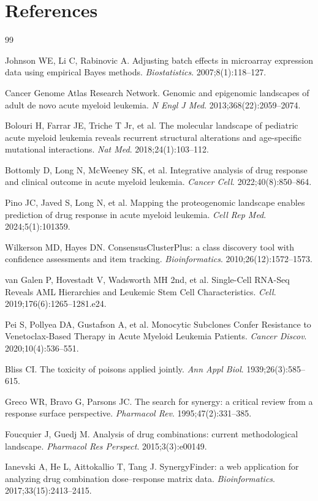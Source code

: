 \documentclass[11pt,a4paper]{article}
\begin{document}
\section*{References}
\begin{thebibliography}{99}

Johnson WE, Li C, Rabinovic A.
Adjusting batch effects in microarray expression data using empirical Bayes methods.
\textit{Biostatistics}. 2007;8(1):118--127.

Cancer Genome Atlas Research Network.
Genomic and epigenomic landscapes of adult de novo acute myeloid leukemia.
\textit{N Engl J Med}. 2013;368(22):2059--2074.

Bolouri H, Farrar JE, Triche T Jr, et al.
The molecular landscape of pediatric acute myeloid leukemia reveals recurrent structural alterations and age-specific mutational interactions.
\textit{Nat Med}. 2018;24(1):103--112.

Bottomly D, Long N, McWeeney SK, et al.
Integrative analysis of drug response and clinical outcome in acute myeloid leukemia.
\textit{Cancer Cell}. 2022;40(8):850--864.

Pino JC, Javed S, Long N, et al.
Mapping the proteogenomic landscape enables prediction of drug response in acute myeloid leukemia.
\textit{Cell Rep Med}. 2024;5(1):101359.

Wilkerson MD, Hayes DN.
ConsensusClusterPlus: a class discovery tool with confidence assessments and item tracking.
\textit{Bioinformatics}. 2010;26(12):1572--1573.

van Galen P, Hovestadt V, Wadsworth MH 2nd, et al.
Single-Cell RNA-Seq Reveals AML Hierarchies and Leukemic Stem Cell Characteristics.
\textit{Cell}. 2019;176(6):1265--1281.e24.

Pei S, Pollyea DA, Gustafson A, et al.
Monocytic Subclones Confer Resistance to Venetoclax-Based Therapy in Acute Myeloid Leukemia Patients.
\textit{Cancer Discov}. 2020;10(4):536--551.

Bliss CI.
The toxicity of poisons applied jointly.
\textit{Ann Appl Biol}. 1939;26(3):585--615.

Greco WR, Bravo G, Parsons JC.
The search for synergy: a critical review from a response surface perspective.
\textit{Pharmacol Rev}. 1995;47(2):331--385.

Foucquier J, Guedj M.
Analysis of drug combinations: current methodological landscape.
\textit{Pharmacol Res Perspect}. 2015;3(3):e00149.

Ianevski A, He L, Aittokallio T, Tang J.
SynergyFinder: a web application for analyzing drug combination dose--response matrix data.
\textit{Bioinformatics}. 2017;33(15):2413--2415.

\end{thebibliography}
\end{document}
